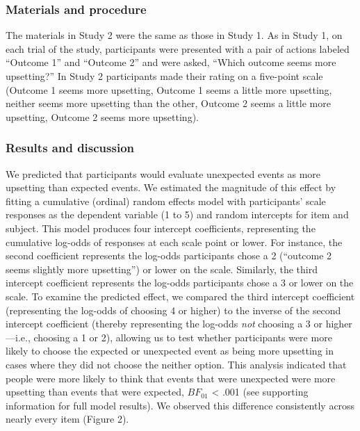 \documentclass[9pt,twocolumn,twoside,]{pnas-new}
\begin{document}
{\subsubsection*{Materials and procedure}\label{s2-materials-procedure}

The materials in Study 2 were the same as those in Study 1. As in Study
1, on each trial of the study, participants were presented with a pair
of actions labeled ``Outcome 1'' and ``Outcome 2'' and were asked,
``Which outcome seems more upsetting?'' In Study 2 participants made
their rating on a five-point scale (Outcome 1 seems more upsetting,
Outcome 1 seems a little more upsetting, neither seems more upsetting
than the other, Outcome 2 seems a little more upsetting, Outcome 2 seems
more upsetting).

\subsubsection*{Results and discussion}\label{s2-results}

We predicted that participants would evaluate unexpected events as more
upsetting than expected events. We estimated the magnitude of this
effect by fitting a cumulative (ordinal) random effects model with
participants' scale responses as the dependent variable (1 to 5) and
random intercepts for item and subject. This model produces four
intercept coefficients, representing the cumulative log-odds of
responses at each scale point or lower. For instance, the second
coefficient represents the log-odds participants chose a 2 (``outcome 2
seems slightly more upsetting'') or lower on the scale. Similarly, the
third intercept coefficient represents the log-odds participants chose a
3 or lower on the scale. To examine the predicted effect, we compared
the third intercept coefficient (representing the log-odds of choosing 4
or higher) to the inverse of the second intercept coefficient (thereby
representing the log-odds \emph{not} choosing a 3 or higher---i.e.,
choosing a 1 or 2), allowing us to test whether participants were more
likely to choose the expected or unexpected event as being more
upsetting in cases where they did not choose the neither option. This
analysis indicated that people were more likely to think that events
that were unexpected were more upsetting than events that were expected,
\(BF_{01}\) \textless{} .001 (see supporting information for full model
results). We observed this difference consistently across nearly every
item (Figure 2).

}
\end{document}
